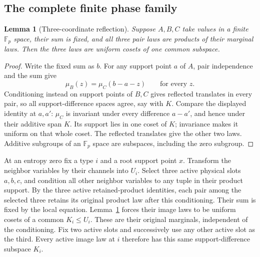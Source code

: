 \documentclass[11pt]{article}
\newtheorem{lemma}[theorem]{Lemma}
\theoremstyle{definition}
\theoremstyle{remark}
\newcommand{\1}{\mathbf 1}
\providecommand{\Fp}{\mathbb F_p}
\begin{document}
\subsection{The complete finite phase family}
\begin{lemma}[Three-coordinate reflection]\label{rec:ch:lem:triple}
Suppose $A,B,C$ take values in a finite $\Fp$ space, their sum is fixed, and all three pair laws are products of their marginal laws. Then the three laws are uniform cosets of one common subspace.
\end{lemma}
\begin{proof}
Write the fixed sum as $b$. For any support point $a$ of $A$, pair independence and the sum give
\[
 \mu_B(z)=\mu_C(b-a-z)\qquad\text{for every }z.
\]
Conditioning instead on support points of $B,C$ gives reflected translates in every pair, so all support-difference spaces agree, say with $K$. Compare the displayed identity at $a,a'$: $\mu_C$ is invariant under every difference $a-a'$, and hence under their additive span $K$. Its support lies in one coset of $K$; invariance makes it uniform on that whole coset. The reflected translates give the other two laws. Additive subgroups of an $\Fp$ space are subspaces, including the zero subgroup.
\end{proof}

At an entropy zero fix a type $i$ and a root support point $x$. Transform the neighbor variables by their channels into $U_i$. Select three active physical slots $a,b,c$, and condition all other neighbor variables to any tuple in their product support. By the three active retained-product identities, each pair among the selected three retains its original product law after this conditioning. Their sum is fixed by the local equation. Lemma~\ref{rec:ch:lem:triple} forces their image laws to be uniform cosets of a common $K_i\le U_i$. These are their original marginals, independent of the conditioning. Fix two active slots and successively use any other active slot as the third. Every active image law at $i$ therefore has this same support-difference subspace $K_i$.
\end{document}

